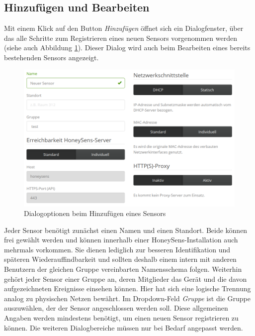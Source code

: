 \documentclass[12pt]{article}
\begin{document}
\subsection{Hinzufügen und Bearbeiten} \label{sensor-edit}
Mit einem Klick auf den Button \textit{Hinzufügen} öffnet sich ein Dialogfenster, über das alle Schritte zum Registrieren eines neuen Sensors vorgenommen werden (siehe auch Abbildung \ref{fig:sensors-edit}). Dieser Dialog wird auch beim Bearbeiten eines bereits bestehenden Sensors angezeigt.

\begin{figure}[h]
				\centering
				\includegraphics[width=\textwidth]{./graphics/sensors-edit.png}
				\caption{Dialogoptionen beim Hinzufügen eines Sensors}
				\label{fig:sensors-edit}
\end{figure}

Jeder Sensor benötigt zunächst einen Namen und einen Standort. Beide können frei gewählt werden und können innerhalb einer HoneySens-Installation auch mehrmals vorkommen. Sie dienen lediglich zur besseren Identifikation und späteren Wiederauffindbarkeit und sollten deshalb einem intern mit anderen Benutzern der gleichen Gruppe vereinbarten Namensschema folgen. Weiterhin gehört jeder Sensor einer Gruppe an, deren Mitglieder das Gerät und die davon aufgezeichneten Ereignisse einsehen können. Hier hat sich eine logische Trennung analog zu physischen Netzen bewährt. Im Dropdown-Feld \textit{Gruppe} ist die Gruppe auszuwählen, der der Sensor angeschlossen werden soll. Diese allgemeinen Angaben werden mindestens benötigt, um einen neuen Sensor registrieren zu können. Die weiteren Dialogbereiche müssen nur bei Bedarf angepasst werden.
\end{document}
